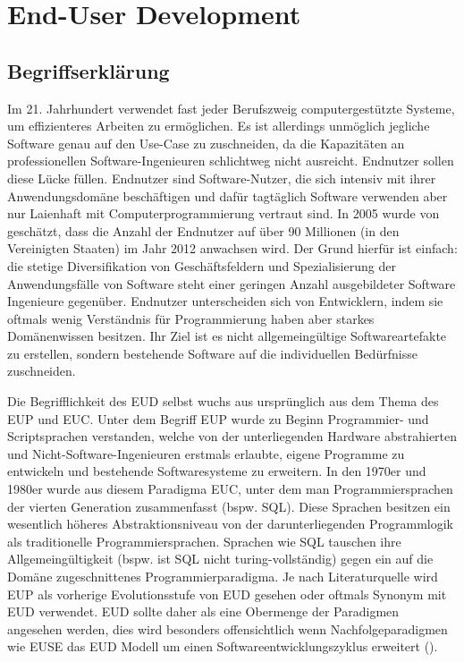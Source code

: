 
\section{End-User Development}
\subsection{Begriffserklärung}
Im 21. Jahrhundert verwendet fast jeder Berufszweig computergestützte Systeme, um effizienteres Arbeiten zu ermöglichen. Es ist allerdings unmöglich jegliche Software genau auf den Use-Case zu zuschneiden, da die Kapazitäten an professionellen Software-Ingenieuren schlichtweg nicht ausreicht. Endnutzer sollen diese Lücke füllen. Endnutzer sind Software-Nutzer, die sich intensiv mit ihrer Anwendungsdomäne beschäftigen und dafür tagtäglich Software verwenden aber nur Laienhaft mit Computerprogrammierung vertraut sind. In 2005 wurde von \cite{Scaffidi2005eudnumbers} geschätzt, dass die Anzahl der Endnutzer auf über 90 Millionen (in den Vereinigten Staaten) im Jahr 2012 anwachsen wird. Der Grund hierfür ist einfach: die stetige Diversifikation von Geschäftsfeldern und Spezialisierung der Anwendungsfälle von Software steht einer geringen Anzahl ausgebildeter Software Ingenieure gegenüber. Endnutzer unterscheiden sich von Entwicklern, indem sie oftmals wenig Verständnis für Programmierung haben aber starkes Domänenwissen besitzen. Ihr Ziel ist es nicht allgemeingültige Softwareartefakte zu erstellen, sondern bestehende Software auf die individuellen Bedürfnisse zuschneiden.

Die Begrifflichkeit des \acf{EUD} selbst wuchs aus ursprünglich aus dem Thema des \ac{EUP} und \ac{EUC}. Unter dem Begriff \ac{EUP} wurde zu Beginn Programmier- und Scriptsprachen verstanden, welche von der unterliegenden Hardware abstrahierten und Nicht-Software-Ingenieuren erstmals erlaubte, eigene Programme zu entwickeln und bestehende Softwaresysteme zu erweitern. In den 1970er und 1980er wurde aus diesem  Paradigma \ac{EUC}, unter dem man Programmiersprachen der vierten Generation zusammenfasst (bspw. SQL). Diese Sprachen besitzen ein wesentlich höheres Abstraktionsniveau von der darunterliegenden Programmlogik als traditionelle Programmiersprachen. Sprachen wie SQL tauschen ihre Allgemeingültigkeit (bspw. ist SQL nicht turing-vollständig) gegen ein auf die Domäne zugeschnittenes Programmierparadigma. Je nach Literaturquelle wird \ac{EUP} als vorherige Evolutionsstufe von \ac{EUD} gesehen oder oftmals Synonym mit \ac{EUD} verwendet. \ac{EUD} sollte daher als eine Obermenge der Paradigmen angesehen werden, dies wird besonders offensichtlich wenn Nachfolgeparadigmen wie \ac{EUSE} das \ac{EUD} Modell um einen Softwareentwicklungszyklus erweitert (\cite{Ko2011EUSE}).

